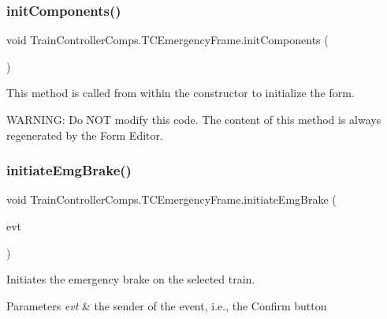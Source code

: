 \subsubsection{\texorpdfstring{init\+Components()}{initComponents()}}
{\footnotesize\ttfamily void Train\+Controller\+Comps.\+T\+C\+Emergency\+Frame.\+init\+Components (\begin{DoxyParamCaption}{ }\end{DoxyParamCaption})\hspace{0.3cm}{\ttfamily [private]}}



This method is called from within the constructor to initialize the form. 

W\+A\+R\+N\+I\+NG\+: Do N\+OT modify this code. The content of this method is always regenerated by the Form Editor. \mbox{\label{classTrainControllerComps_1_1TCEmergencyFrame_a03d0a51aadee6e85a856d7f4e1d41677}} 
\subsubsection{\texorpdfstring{initiate\+Emg\+Brake()}{initiateEmgBrake()}}
{\footnotesize\ttfamily void Train\+Controller\+Comps.\+T\+C\+Emergency\+Frame.\+initiate\+Emg\+Brake (\begin{DoxyParamCaption}\item[{java.\+awt.\+event.\+Action\+Event}]{evt }\end{DoxyParamCaption})\hspace{0.3cm}{\ttfamily [private]}}



Initiates the emergency brake on the selected train. 


\begin{DoxyParams}{Parameters}
{\em evt} & the sender of the event, i.\+e., the \textquotesingle{}Confirm\textquotesingle{} button \\
\hline
\end{DoxyParams}
\mbox{\label{classTrainControllerComps_1_1TCEmergencyFrame_a3a4826e73daed7e795104224492dfd78}} 
